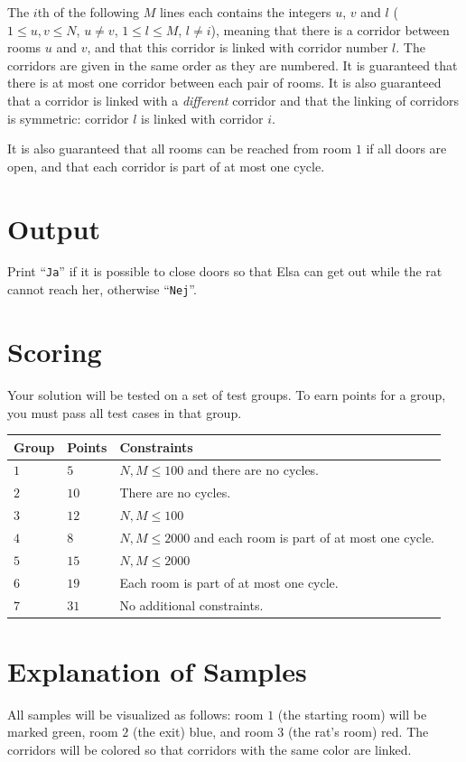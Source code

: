 The $i$th of the following $M$ lines each contains the integers $u$, $v$ and $l$ ($1 \leq u,v \leq N$, $u \neq v$, $1 \leq l \leq M$, $l \neq i$),
meaning that there is a corridor between rooms $u$ and $v$, and that this corridor is linked with corridor number $l$.
The corridors are given in the same order as they are numbered.
It is guaranteed that there is at most one corridor between each pair of rooms.
It is also guaranteed that a corridor is linked with a \textit{different} corridor and that the linking of corridors is symmetric: corridor $l$ is linked with corridor $i$.

It is also guaranteed that all rooms can be reached from room $1$ if all doors are open, and that each corridor is part of at most one cycle.

\section*{Output}
Print ``\texttt{Ja}'' if it is possible to close doors so that Elsa can get out while the rat cannot reach her, otherwise ``\texttt{Nej}''.

\section*{Scoring}
Your solution will be tested on a set of test groups.
To earn points for a group, you must pass all test cases in that group.

\noindent
\begin{tabular}{| l | l | p{12cm} |}
  \hline
  \textbf{Group} & \textbf{Points} & \textbf{Constraints} \\ \hline
  $1$    & $5$        & $N, M \leq 100$ and there are no cycles. \\ \hline
  $2$    & $10$       & There are no cycles. \\ \hline
  $3$    & $12$       & $N, M \leq 100$ \\ \hline
  $4$    & $8$        & $N, M \leq 2000$ and each room is part of at most one cycle. \\ \hline
  $5$    & $15$       & $N, M \leq 2000$ \\ \hline
  $6$    & $19$       & Each room is part of at most one cycle. \\ \hline
  $7$    & $31$       & No additional constraints. \\ \hline
\end{tabular}

\section*{Explanation of Samples}
All samples will be visualized as follows:
room $1$ (the starting room) will be marked green,
room $2$ (the exit) blue,
and room $3$ (the rat's room) red.
The corridors will be colored so that corridors with the same color are linked.

